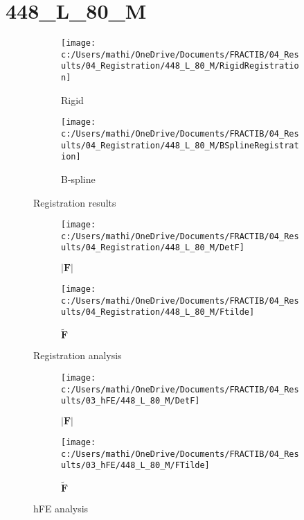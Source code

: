 \documentclass{article}%
\begin{document}
%
\newpage%
\section*{448\_L\_80\_M}%
\label{sec:448L80M}%


\begin{figure}[h!]%
\begin{subfigure}[b]{0.5\linewidth}%
\texttt{[image: c:/Users/mathi/OneDrive/Documents/FRACTIB/04\_Results/04\_Registration/448\_L\_80\_M/RigidRegistration]}%
\caption{Rigid}%
\end{subfigure}%
\begin{subfigure}[b]{0.5\linewidth}%
\texttt{[image: c:/Users/mathi/OneDrive/Documents/FRACTIB/04\_Results/04\_Registration/448\_L\_80\_M/BSplineRegistration]}%
\caption{B{-}spline}%
\end{subfigure}%
\caption{Registration results}%
\end{figure}

%


\begin{figure}[h!]%
\begin{subfigure}[b]{0.5\linewidth}%
\texttt{[image: c:/Users/mathi/OneDrive/Documents/FRACTIB/04\_Results/04\_Registration/448\_L\_80\_M/DetF]}%
\caption{$|\mathbf{F}|$}%
\end{subfigure}%
\begin{subfigure}[b]{0.5\linewidth}%
\texttt{[image: c:/Users/mathi/OneDrive/Documents/FRACTIB/04\_Results/04\_Registration/448\_L\_80\_M/Ftilde]}%
\caption{$\tilde{\mathbf{F}}$}%
\end{subfigure}%
\caption{Registration analysis}%
\end{figure}

%


\begin{figure}[h!]%
\begin{subfigure}[b]{0.5\linewidth}%
\texttt{[image: c:/Users/mathi/OneDrive/Documents/FRACTIB/04\_Results/03\_hFE/448\_L\_80\_M/DetF]}%
\caption{$|\mathbf{F}|$}%
\end{subfigure}%
\begin{subfigure}[b]{0.5\linewidth}%
\texttt{[image: c:/Users/mathi/OneDrive/Documents/FRACTIB/04\_Results/03\_hFE/448\_L\_80\_M/FTilde]}%
\caption{$\tilde{\mathbf{F}}$}%
\end{subfigure}%
\caption{hFE analysis}%
\end{figure}
\end{document}
